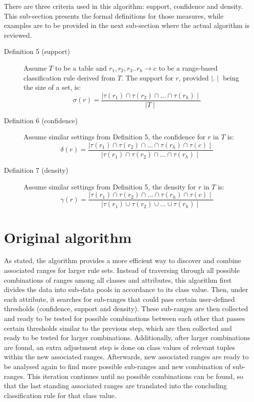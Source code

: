 There are three criteria used in this algorithm: support, confidence and density. This sub-section presents the formal definitions for those measures, while examples are to be provided in the next sub-section where the actual algorithm is reviewed.

\begin{description}
\item[Definition 5 (support)]
Assume $T$ to be a table and $r_1, r_2, r_3..r_h \rightarrow c$ to be a range-based classification rule derived from $T$. The support for $r$, provided $\mid . \mid$ being the size of a set, is: 
\[ \sigma(r) = \frac{\mid \tau(r_1) \cap \tau(r_2) \cap ... \cap \tau(r_h) \mid}{\mid T \mid} \] 

\item[Definition 6 (confidence)]
Assume similar settings from Definition 5, the confidence for $r$  in $T$ is:
\[ \delta(r) = \frac{\mid \tau(r_1) \cap \tau(r_2) \cap ... \cap \tau(r_h) \cap \tau(c) \mid}{\mid \tau(r_1) \cap \tau(r_2) \cap ... \cap \tau(r_h) \mid} \] 

\item[Definition 7 (density)]
Assume similar settings from Definition 5, the density for $r$ in $T$ is:
\[ \gamma(r) = \frac{\mid \tau(r_1) \cap \tau(r_2) \cap ... \cap \tau(r_h) \cap \tau(c) \mid}{\mid \tau(r_1) \cup \tau(r_2) \cup ... \cup \tau(r_h) \mid} \] 

\end{description}



\section{Original algorithm}

As stated, the algorithm provides a more efficient way to discover and combine associated ranges for larger rule sets. Instead of traversing through all possible combinations of ranges among all classes and attributes, this algorithm first divides the data into sub-data pools in accordance to its class value. Then, under each attribute, it searches for sub-ranges that could pass certain user-defined thresholds (confidence, support and density). These sub-ranges are then collected and ready to be tested for possible combinations between each other that passes certain thresholds similar to the previous step, which are then collected and ready to be tested for larger combinations. Additionally, after larger combinations are found, an extra adjustment step is done on class values of relevant tuples within the new associated ranges. Afterwards, new associated ranges are ready to be analysed again to find more possible sub-ranges and new combination of sub-ranges. This iteration continues until no possible combinations can be found, so that the last standing associated ranges are translated into the concluding classification rule for that class value. 

